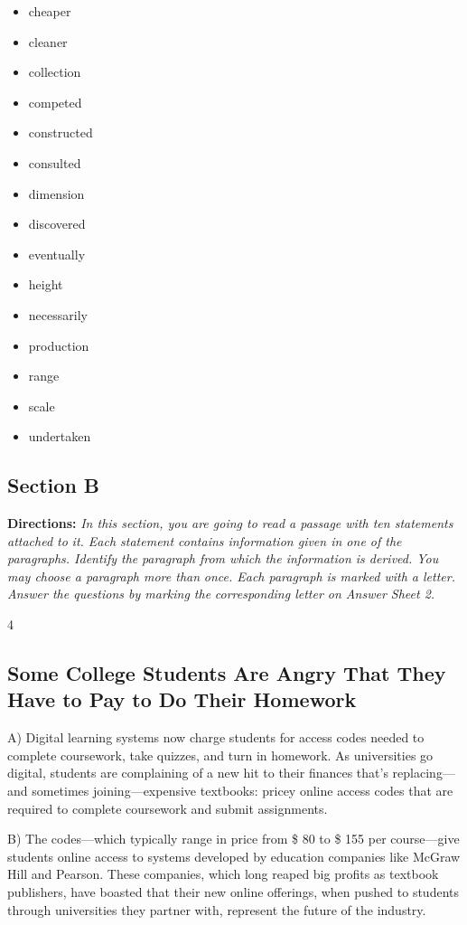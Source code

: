 \documentclass[UTF8,11pt]{ctexart}
\begin{document}
\begin{itemize}[leftmargin=2em,itemsep=.2em,topsep=.4em]\item[A.] cheaper
\item[B.] cleaner
\item[C.] collection
\item[D.] competed
\item[E.] constructed
\item[F.] consulted
\item[G.] dimension
\item[H.] discovered
\item[I.] eventually
\item[J.] height
\item[K.] necessarily
\item[L.] production
\item[M.] range
\item[N.] scale
\item[O.] undertaken
\end{itemize}

\subsection*{\textbf{Section B}}


\textbf{Directions:}\textit{ In this section, you are going to read a passage with ten statements attached to} \textit{it. Each statement contains information given in one of the paragraphs. Identify the} \textit{paragraph from which the information is derived. You may choose a paragraph more than} \textit{once. Each paragraph is marked with a letter. Answer the questions by marking the} \textit{corresponding letter on Answer Sheet 2.}


4


\subsection*{\textbf{Some College Students Are Angry That They Have to Pay to Do Their Homework}}


A) Digital learning systems now charge students for access codes needed to complete coursework, take quizzes, and turn in homework. As universities go digital, students are complaining of a new hit to their finances that's replacing—and sometimes joining—expensive textbooks: pricey online access codes that are required to complete coursework and submit assignments.


B) The codes—which typically range in price from \$ 80 to \$ 155 per course—give students online access to systems developed by education companies like McGraw Hill and Pearson. These companies, which long reaped big profits as textbook publishers, have boasted that their new online offerings, when pushed to students through universities they partner with, represent the future of the industry.
\end{document}
